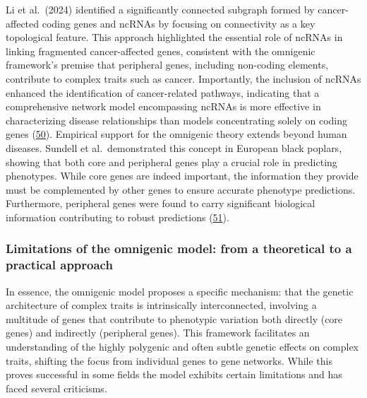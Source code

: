 Li et al.~(2024) identified a significantly connected subgraph formed by cancer-affected coding genes and ncRNAs by focusing on connectivity as a key topological feature.
This approach highlighted the essential role of ncRNAs in linking fragmented cancer-affected genes, consistent with the omnigenic framework's premise that peripheral genes, including non-coding elements, contribute to complex traits such as cancer.
Importantly, the inclusion of ncRNAs enhanced the identification of cancer-related pathways, indicating that a comprehensive network model encompassing ncRNAs is more effective in characterizing disease relationships than models concentrating solely on coding genes (\protect\hyperlink{ref-13VkGrWQR}{50}).
Empirical support for the omnigenic theory extends beyond human diseases.
Sundell et al.~demonstrated this concept in European black poplars, showing that both core and peripheral genes play a crucial role in predicting phenotypes.
While core genes are indeed important, the information they provide must be complemented by other genes to ensure accurate phenotype predictions.
Furthermore, peripheral genes were found to carry significant biological information contributing to robust predictions (\protect\hyperlink{ref-EgquVUSg}{51}).

\hypertarget{limitations-of-the-omnigenic-model-from-a-theoretical-to-a-practical-approach}{%
\subsubsection{Limitations of the omnigenic model: from a theoretical to a practical approach}\label{limitations-of-the-omnigenic-model-from-a-theoretical-to-a-practical-approach}}

In essence, the omnigenic model proposes a specific mechanism: that the genetic architecture of complex traits is intrinsically interconnected, involving a multitude of genes that contribute to phenotypic variation both directly (core genes) and indirectly (peripheral genes).
This framework facilitates an understanding of the highly polygenic and often subtle genetic effects on complex traits, shifting the focus from individual genes to gene networks.
While this proves successful in some fields the model exhibits certain limitations and has faced several criticisms.

